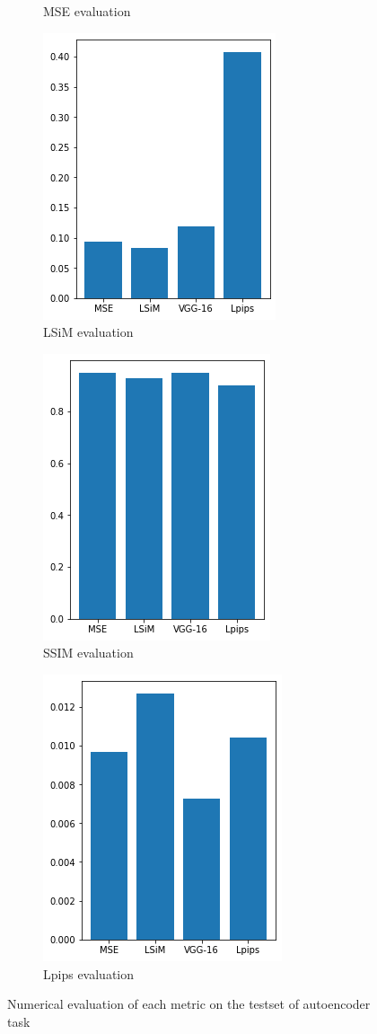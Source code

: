 \documentclass[a4paper,12pt,twoside]{report}
\begin{document}
\begin{figure}
\begin{subfigure}{0.32\textwidth}
		\caption{MSE evaluation}
	\end{subfigure}
	\begin{subfigure}{0.32\textwidth}
		\centering
		\includegraphics[scale=0.5]{autoencoder/lsimeval.png}
		\caption{LSiM evaluation}
	\end{subfigure}
	\begin{subfigure}{0.32\textwidth}
		\centering
		\includegraphics[scale=0.5]{autoencoder/ssimeval.png}
		\caption{SSIM evaluation}
	\end{subfigure}
	\begin{subfigure}{0.32\textwidth}
		\centering
		\includegraphics[scale=0.5]{autoencoder/lpipseval.png}
		\caption{Lpips evaluation}
	\end{subfigure}
	\caption{Numerical evaluation of each metric on the testset of autoencoder task}
	\label{autoencoder numeval}
\end{figure}
\end{document}
